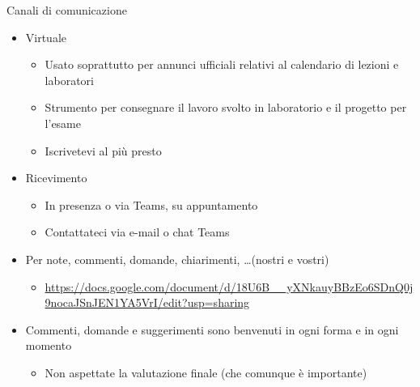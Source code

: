 \begin{frame}{Canali di comunicazione}

  \begin{itemize}[<+->]
  \item Virtuale

    \begin{itemize}[<.->]
    \item Usato soprattutto per annunci ufficiali relativi al calendario di
      lezioni e laboratori
    \item Strumento per consegnare il lavoro svolto in laboratorio e il progetto
      per l'esame
    \item Iscrivetevi al più presto
    \end{itemize}

  \item Ricevimento

    \begin{itemize}[<.->]
    \item In presenza o via Teams, su appuntamento
    \item Contattateci via e-mail o chat Teams
    \end{itemize}

  \item Per note, commenti, domande, chiarimenti, \ldots (nostri e vostri)
    \begin{itemize}[<.->]
    \item \url{https://docs.google.com/document/d/18U6B__yXNkauyBBzEo6SDnQ0j9nocaJSnJEN1YA5VrI/edit?usp=sharing}
    \end{itemize}

  \item Commenti, domande e suggerimenti sono benvenuti in ogni forma e in ogni
    momento
    \begin{itemize}[<.->]
    \item Non aspettate la valutazione finale (che comunque è importante)
    \end{itemize}

  \end{itemize}

\end{frame}

